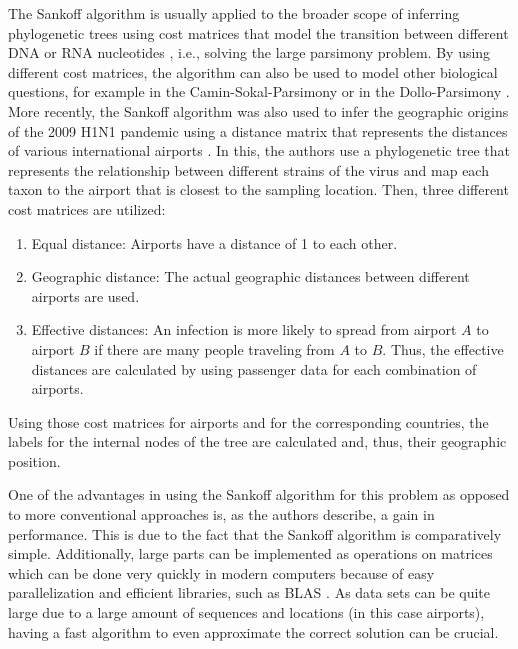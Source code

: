 \documentclass{article}
\begin{document}
The Sankoff algorithm is usually applied to the broader scope of inferring
phylogenetic trees using cost matrices that model the transition between
different DNA or RNA nucleotides
\cite{jonesIntroductionBioinformaticsAlgorithms2004}, i.e., solving the large
parsimony problem. By using different cost matrices, the algorithm can also be
used to model other biological questions, for example in the
Camin-Sokal-Parsimony \cite{caminMethodDeducingBranching1965} or in the
Dollo-Parsimony \cite{farrisPhylogeneticAnalysisDollo2022}. More recently, the
Sankoff algorithm was also used to infer the geographic origins of the 2009 H1N1
pandemic using a distance matrix that represents the distances of various
international airports \cite{reimeringPhylogeographicReconstructionUsing2020}.
In this, the authors use a phylogenetic tree that represents the relationship
between different strains of the virus and map each taxon to the airport that is
closest to the sampling location. Then, three different cost matrices are
utilized:

\begin{enumerate}
  \item Equal distance: Airports have a distance of 1 to each other.
  \item Geographic distance: The actual geographic distances between different
  airports are used.
  \item Effective distances: An infection is more likely to spread from airport
  $A$ to airport $B$ if there are many people traveling from $A$ to $B$. Thus,
  the effective distances are calculated by using passenger data for each
  combination of airports.
\end{enumerate}

Using those cost matrices for airports and for the corresponding countries, the
labels for the internal nodes of the tree are calculated and, thus, their
geographic position.

One of the advantages in using the Sankoff algorithm for this problem as opposed
to more conventional approaches is, as the authors describe, a gain in
performance. This is due to the fact that the Sankoff algorithm is comparatively
simple. Additionally, large parts can be implemented as operations on matrices
which can be done very quickly in modern computers because of easy
parallelization and efficient libraries, such as BLAS
\cite{lawsonBasicLinearAlgebra1979}. As data sets can be quite large due to a
large amount of sequences and locations (in this case airports), having a fast
algorithm to even approximate the correct solution can be crucial.
\end{document}
